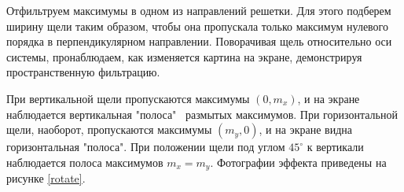 \documentclass[a4paper,12pt]{article}
\begin{document}
Отфильтруем максимумы в одном из направлений решетки. Для этого подберем ширину щели таким образом, чтобы она пропускала только максимум нулевого порядка в перпендикулярном направлении. Поворачивая щель относительно оси системы, пронаблюдаем, как изменяется картина на экране, демонстрируя пространственную фильтрацию. 

При вертикальной щели пропускаются максимумы $(0, m_x)$, и на экране наблюдается вертикальная "полоса" \ размытых максимумов. При горизонтальной щели, наоборот, пропускаются максимумы $(m_y, 0)$, и на экране видна горизонтальная "полоса". При положении щели под углом $45^\circ$ к вертикали наблюдается полоса максимумов $m_x = m_y$. Фотографии эффекта приведены на рисунке \ref{rotate}. 

\begin{figure}[h]
	\begin{minipage}[h]{0.3\linewidth}
	\end{minipage}
	\hfill
	\begin{minipage}[h]{0.3\linewidth}

\end{minipage}
\end{figure}
\end{document}
